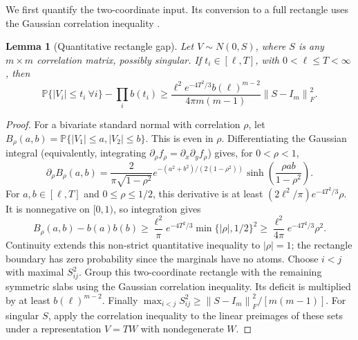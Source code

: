 \documentclass[11pt]{article}
\newtheorem{lemma}[theorem]{Lemma}
\theoremstyle{remark}\newtheorem{remark}[theorem]{Remark}
\newcommand{\Pp}{\mathbb P}
\newcommand{\norm}[1]{\left\lVert#1\right\rVert}
\begin{document}
We first quantify the two-coordinate input. Its conversion to a full rectangle
uses the Gaussian correlation inequality \cite{Royen}.
\begin{lemma}[Quantitative rectangle gap]\label{lem:rectangle}
Let $V\sim N(0,S)$, where $S$ is any $m\times m$ correlation matrix, possibly
singular. If $t_i\in[\ell,T]$, with $0<\ell\le T<\infty$, then
\begin{equation}\label{eq:rectangle}
 \Pp\{|V_i|\le t_i\ \forall i\}-\prod_i b(t_i)
 \ge \frac{\ell^2e^{-4T^2/3}b(\ell)^{m-2}}{4\pi m(m-1)}
       \norm{S-I_m}_F^2.
\end{equation}
\end{lemma}
\begin{proof}
For a bivariate standard normal with correlation $\rho$, let
$B_\rho(a,b)=\Pp\{|V_1|\le a,|V_2|\le b\}$.
This is even in $\rho$. Differentiating the Gaussian integral (equivalently,
integrating $\partial_\rho f_\rho=\partial_x\partial_y f_\rho$) gives, for $0<\rho<1$,
\[
 \partial_\rho B_\rho(a,b)=
 \frac{2}{\pi\sqrt{1-\rho^2}}
 e^{-(a^2+b^2)/(2(1-\rho^2))}
 \sinh\!\left(\frac{\rho ab}{1-\rho^2}\right).
\]
For $a,b\in[\ell,T]$ and $0\le\rho\le1/2$, this derivative is at least
$(2\ell^2/\pi)e^{-4T^2/3}\rho$. It is nonnegative on $[0,1)$, so integration gives
\[
 B_\rho(a,b)-b(a)b(b)
 \ge \frac{\ell^2}{\pi}e^{-4T^2/3}\min\{|\rho|,1/2\}^2
 \ge \frac{\ell^2}{4\pi}e^{-4T^2/3}\rho^2.
\]
Continuity extends this non-strict quantitative inequality to $|\rho|=1$;
the rectangle boundary has zero probability since the marginals have no atoms.
Choose $i<j$ with maximal $S_{ij}^2$. Group this two-coordinate rectangle
with the remaining symmetric slabs using the Gaussian correlation inequality.
Its deficit is multiplied by at least $b(\ell)^{m-2}$.
Finally $\max_{i<j}S_{ij}^2\ge\norm{S-I_m}_F^2/[m(m-1)]$.
For singular $S$, apply the correlation inequality to the linear preimages of
these sets under a representation $V=TW$ with nondegenerate $W$.
\end{proof}
\end{document}
